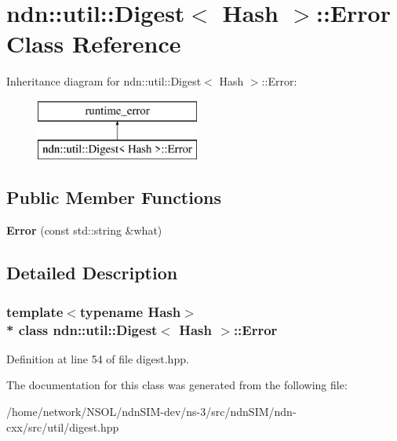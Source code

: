 \hypertarget{classndn_1_1util_1_1Digest_1_1Error}{}\section{ndn\+:\+:util\+:\+:Digest$<$ Hash $>$\+:\+:Error Class Reference}
\label{classndn_1_1util_1_1Digest_1_1Error}
Inheritance diagram for ndn\+:\+:util\+:\+:Digest$<$ Hash $>$\+:\+:Error\+:\begin{figure}[H]
\begin{center}
\leavevmode
\includegraphics[height=2.000000cm]{classndn_1_1util_1_1Digest_1_1Error}
\end{center}
\end{figure}
\subsection*{Public Member Functions}
\begin{DoxyCompactItemize}
\item 
{\bfseries Error} (const std\+::string \&what)\hypertarget{classndn_1_1util_1_1Digest_1_1Error_a7e6d05f51ce938470ad4372547fb2b3f}{}\label{classndn_1_1util_1_1Digest_1_1Error_a7e6d05f51ce938470ad4372547fb2b3f}

\end{DoxyCompactItemize}


\subsection{Detailed Description}
\subsubsection*{template$<$typename Hash$>$\\*
class ndn\+::util\+::\+Digest$<$ Hash $>$\+::\+Error}



Definition at line 54 of file digest.\+hpp.



The documentation for this class was generated from the following file\+:\begin{DoxyCompactItemize}
\item 
/home/network/\+N\+S\+O\+L/ndn\+S\+I\+M-\/dev/ns-\/3/src/ndn\+S\+I\+M/ndn-\/cxx/src/util/digest.\+hpp\end{DoxyCompactItemize}
